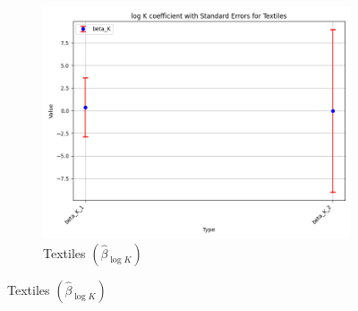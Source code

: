 \documentclass{article}
\begin{document}
\begin{figure}[ht!]
\begin{subfigure}[t]{0.32\textwidth}
        \centering
        \includegraphics[width=\textwidth]{figure/empirical_ar1_normal_kmshare_ciiu_beta_logK_with_error_bars_Textiles.png}
        \caption{Textiles $(\hat{\beta}_{\log K})$}
    \end{subfigure}


\end{figure}
\end{document}
